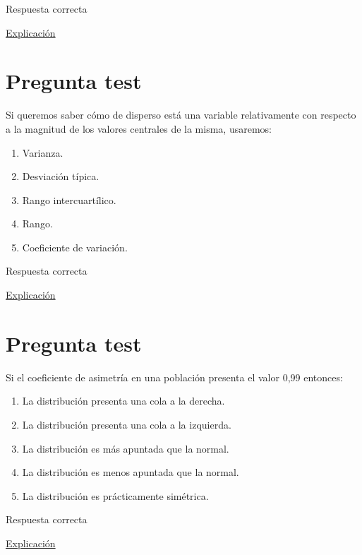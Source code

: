\documentclass[
]{book}
\providecommand{\tightlist}{%
  \setlength{\itemsep}{0pt}\setlength{\parskip}{0pt}}
\begin{document}
Respuesta correcta

\href{https://1fjmanzano.github.io/bioestadistica/medidas-de-posicio\%CC\%81n-dispersio\%CC\%81n-y-forma.html\#medidas-de-dispersio\%CC\%81n}{Explicación}

\hypertarget{pregunta-test-49}{%
\section{Pregunta test}\label{pregunta-test-49}}

Si queremos saber cómo de disperso está una variable relativamente con respecto a la magnitud de los valores centrales de la misma, usaremos:

\begin{enumerate}
\def\labelenumi{\alph{enumi})}
\tightlist
\item
  Varianza.
\item
  Desviación típica.
\item
  Rango intercuartílico.
\item
  Rango.
\item
  Coeficiente de variación.
\end{enumerate}

Respuesta correcta

\href{https://en.wikipedia.org/wiki/Coefficient_of_variation}{Explicación}

\hypertarget{pregunta-test-50}{%
\section{Pregunta test}\label{pregunta-test-50}}

Si el coeficiente de asimetría en una población presenta el valor 0,99 entonces:

\begin{enumerate}
\def\labelenumi{\alph{enumi})}
\tightlist
\item
  La distribución presenta una cola a la derecha.
\item
  La distribución presenta una cola a la izquierda.
\item
  La distribución es más apuntada que la normal.
\item
  La distribución es menos apuntada que la normal.
\item
  La distribución es prácticamente simétrica.
\end{enumerate}

Respuesta correcta

\href{https://1fjmanzano.github.io/bioestadistica/medidas-de-forma.html}{Explicación}
\end{document}
